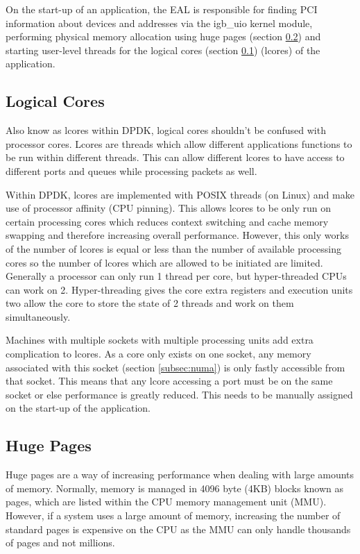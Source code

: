 \documentclass[final_report.tex]{subfiles}
\begin{document}
On the start-up of an application, the EAL is responsible for finding PCI information about devices and addresses via the igb\_uio kernel module, performing physical memory allocation using huge pages (section \ref{subsec:hugepages}) and starting user-level threads for the logical cores (section \ref{subsec:logical_cores}) (lcores) of the application. 

\subsection{Logical Cores}
\label{subsec:logical_cores}
Also know as lcores within DPDK, logical cores shouldn't be confused with processor cores. Lcores are threads which allow different applications functions to be run within different threads. This can allow different lcores to have access to different ports and queues while processing packets as well.

Within DPDK, lcores are implemented with POSIX threads (on Linux) and make use of processor affinity (CPU pinning). This allows lcores to be only run on certain processing cores which reduces context switching and cache memory swapping and therefore increasing overall performance. However, this only works of the number of lcores is equal or less than the number of available processing cores so the number of lcores which are allowed to be initiated are limited. Generally a processor can only run 1 thread per core, but hyper-threaded CPUs can work on 2. Hyper-threading gives the core extra registers and execution units two allow the core to store the state of 2 threads and work on them simultaneously.

Machines with multiple sockets with multiple processing units add extra complication to lcores. As a core only exists on one socket, any memory associated with this socket (section \ref{subsec:numa}) is only fastly accessible from that socket. This means that any lcore accessing a port must be on the same socket or else performance is greatly reduced. This needs to be manually assigned on the start-up of the application.

\subsection{Huge Pages}
\label{subsec:hugepages}
Huge pages are a way of increasing performance when dealing with large amounts of memory. Normally, memory is managed in 4096 byte (4KB) blocks known as pages, which are listed within the CPU memory management unit (MMU). However, if a system uses a large amount of memory, increasing the number of standard pages is expensive on the CPU as the MMU can only handle thousands of pages and not millions.
\end{document}
